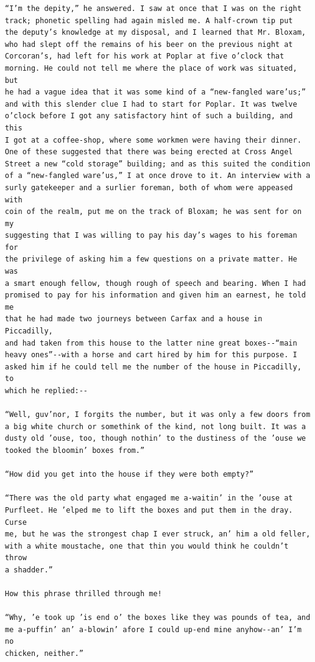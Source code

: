\documentclass{article}
\begin{document}
\begin{verbatim}
“I’m the depity,” he answered. I saw at once that I was on the right
track; phonetic spelling had again misled me. A half-crown tip put
the deputy’s knowledge at my disposal, and I learned that Mr. Bloxam,
who had slept off the remains of his beer on the previous night at
Corcoran’s, had left for his work at Poplar at five o’clock that
morning. He could not tell me where the place of work was situated, but
he had a vague idea that it was some kind of a “new-fangled ware’us;”
and with this slender clue I had to start for Poplar. It was twelve
o’clock before I got any satisfactory hint of such a building, and this
I got at a coffee-shop, where some workmen were having their dinner.
One of these suggested that there was being erected at Cross Angel
Street a new “cold storage” building; and as this suited the condition
of a “new-fangled ware’us,” I at once drove to it. An interview with a
surly gatekeeper and a surlier foreman, both of whom were appeased with
coin of the realm, put me on the track of Bloxam; he was sent for on my
suggesting that I was willing to pay his day’s wages to his foreman for
the privilege of asking him a few questions on a private matter. He was
a smart enough fellow, though rough of speech and bearing. When I had
promised to pay for his information and given him an earnest, he told me
that he had made two journeys between Carfax and a house in Piccadilly,
and had taken from this house to the latter nine great boxes--“main
heavy ones”--with a horse and cart hired by him for this purpose. I
asked him if he could tell me the number of the house in Piccadilly, to
which he replied:--

“Well, guv’nor, I forgits the number, but it was only a few doors from
a big white church or somethink of the kind, not long built. It was a
dusty old ’ouse, too, though nothin’ to the dustiness of the ’ouse we
tooked the bloomin’ boxes from.”

“How did you get into the house if they were both empty?”

“There was the old party what engaged me a-waitin’ in the ’ouse at
Purfleet. He ’elped me to lift the boxes and put them in the dray. Curse
me, but he was the strongest chap I ever struck, an’ him a old feller,
with a white moustache, one that thin you would think he couldn’t throw
a shadder.”

How this phrase thrilled through me!

“Why, ’e took up ’is end o’ the boxes like they was pounds of tea, and
me a-puffin’ an’ a-blowin’ afore I could up-end mine anyhow--an’ I’m no
chicken, neither.”


\end{verbatim}
\end{document}
